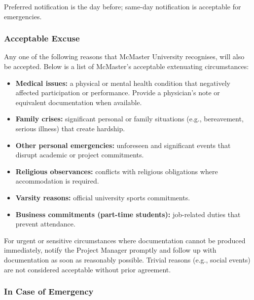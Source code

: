 \documentclass{article}
\begin{document}
Preferred notification is the day before; same-day notification is acceptable for emergencies.

\subsubsection*{Acceptable Excuse}

Any one of the following reasons that McMaster University recognises, will also be accepted. Below is a list of McMaster's acceptable extenuating circumstances:

\begin{itemize}
  \item \textbf{Medical issues:} a physical or mental health condition that negatively affected participation or performance. Provide a physician's note or equivalent documentation when available.
  \item \textbf{Family crises:} significant personal or family situations (e.g., bereavement, serious illness) that create hardship.
  \item \textbf{Other personal emergencies:} unforeseen and significant events that disrupt academic or project commitments.
  \item \textbf{Religious observances:} conflicts with religious obligations where accommodation is required.
  \item \textbf{Varsity reasons:} official university sports commitments.
  \item \textbf{Business commitments (part-time students):} job-related duties that prevent attendance.
\end{itemize}

For urgent or sensitive circumstances where documentation cannot be produced immediately, notify the Project Manager promptly and follow up with documentation as soon as reasonably possible. Trivial reasons (e.g., social events) are not considered acceptable without prior agreement.

\subsubsection*{In Case of Emergency}
\end{document}
